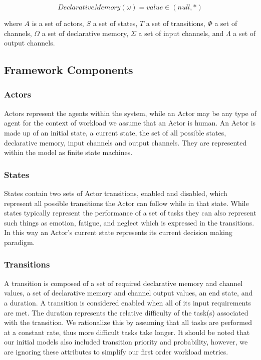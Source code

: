 \begin{equation}
Declarative Memory(\omega) = value \in (null, *)
\end{equation}


where $A$ is a set of actors, $S$ a set of
states, $T$ a set of transitions, $\Phi$ a set of channels, $\Omega$ a set of
declarative memory, $\Sigma$ a set of input channels, and $\Lambda$ a set of
output channels.

\subsection{Framework Components}
\subsubsection{Actors}
Actors represent the agents within the system, while an Actor may be any type of
agent for the context of workload we assume that an Actor is human.  An Actor is
made up of an initial state, a current state, the set of all possible states,
declarative memory, input channels and output channels.  They are represented
within the model as finite state machines.

\subsubsection{States}
States contain two sets of Actor transitions, enabled and disabled, which
represent all possible transitions the Actor can follow while in that state. 
While states typically represent the performance of a set of tasks they can also
represent such things as emotion, fatigue, and neglect which is expressed in the
transitions.  In this way an Actor's current state represents its current
decision making paradigm.

\subsubsection{Transitions}
A transition is composed of a set of required declarative memory and channel
values, a set of declarative memory and channel output values, an end state, and
a duration.  A transition is considered enabled when all of its input
requirements are met.  The duration represents the relative difficulty of the
task(s) associated with the transition.  We rationalize this by assuming that
all tasks are performed at a constant rate, thus more difficult tasks take
longer.  It should be noted that our initial models also included transition
priority and probability, however, we are ignoring these attributes to simplify
our first order workload metrics.

